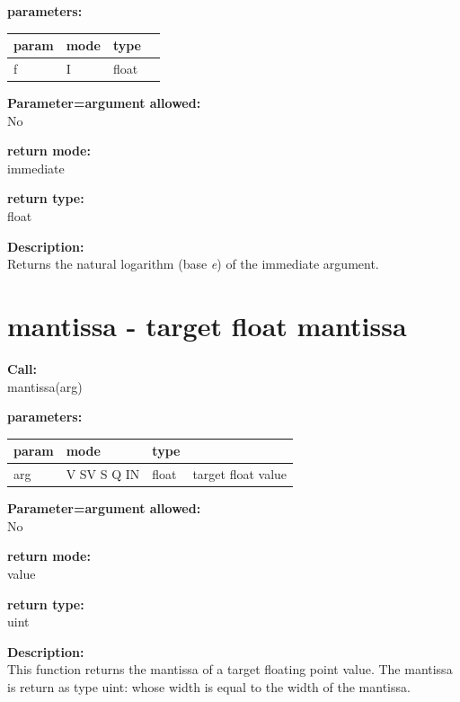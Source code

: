         {\bf parameters:} \\
        \begin{tabular}{| l | l | l | l |}
        \hline
        param  & mode & type & \\
        \hline \hline
        f & I & float & \\ \hline
        \end{tabular}
        
        {\bf Parameter=argument allowed:} \\
        No
        
        {\bf return mode:} \\
        immediate

        {\bf return type:} \\
        float
        
        {\bf Description:} \\
        Returns the natural logarithm (base {\em e}) of the immediate
        argument.


    \section{mantissa - target float mantissa}\label{sec:ifmantissa}
        
        {\bf Call:} \\
        mantissa(arg)
        
        {\bf parameters:} \\
        \begin{tabular}{| l | l | l | l |}
        \hline
        param  & mode & type & \\
        \hline \hline
        arg  & V SV S Q IN & float & target float value  \\ \hline
        \end{tabular}
        
        {\bf Parameter=argument allowed:} \\
        No
        
        {\bf return mode:} \\
        value

        {\bf return type:} \\
        uint
        
        {\bf Description:} \\
        This function returns the mantissa of a target floating point
        value. The mantissa is return as type uint: whose width is
        equal to the width of the mantissa.


